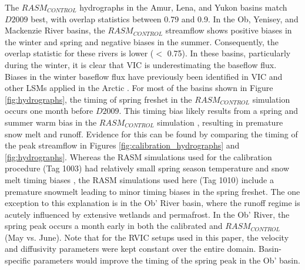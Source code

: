 \documentclass[jgrga, draft]{agutex}
\begin{document}
\begin{article}
The $RASM_{CONTROL}$ hydrographs in the Amur, Lena, and Yukon basins match $D2009$ best, with overlap statistics between 0.79 and 0.9.
In the Ob, Yenisey, and Mackenzie River basins, the $RASM_{CONTROL}$ streamflow shows positive biases in the winter and spring and negative biases in the summer.
Consequently, the overlap statistic for these rivers is lower ($<$ 0.75).
In these basins, particularly during the winter, it is clear that VIC is underestimating the baseflow flux.
Biases in the winter baseflow flux have previously been identified in VIC and other LSMs applied in the Arctic \citep{Slater_2007}.
For most of the basins shown in Figure \ref{fig:hydrographs}, the timing of spring freshet in the $RASM_{CONTROL}$ simulation occurs one month before $D2009$.
This timing bias likely results from a spring and summer warm bias in the $RASM_{CONTROL}$ simulation \citep{Hamman_2016,Cassano_2016}, resulting in premature snow melt and runoff.
Evidence for this can be found by comparing the timing of the peak streamflow in Figures \ref{fig:calibration_hydrographs} and \ref{fig:hydrographs}.
Whereas the RASM simulations used for the calibration procedure (Tag 1003) had relatively small spring season temperature and snow melt timing biases \citep{Hamman_2016}, the RASM simulations used here (Tag 1010) include a premature snowmelt leading to minor timing biases in the spring freshet.
The one exception to this explanation is in the Ob' River basin, where the runoff regime is acutely influenced by extensive wetlands and permafrost.
In the Ob' River, the spring peak occurs a month early in both the calibrated and $RASM_{CONTROL}$ (May vs. June).
Note that for the RVIC setups used in this paper, the velocity and diffusivity parameters were kept constant over the entire domain.
Basin-specific parameters would improve the timing of the spring peak in the Ob' basin.


\end{article}
\end{document}
